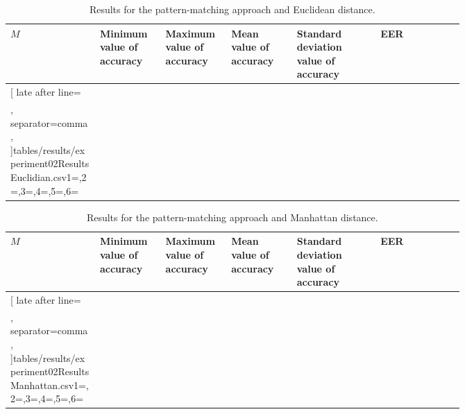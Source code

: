 \begin{table}[H]
	\newcommand{\mc}[3]{\multicolumn{#1}{#2}{#3}}
	\begin{center}
		\begin{tabular}{|p{0.15\linewidth}|p{0.11\linewidth}|p{0.11\linewidth}|p{0.11\linewidth}|p{0.14\linewidth}|p{0.14\linewidth}|}\hline
			\rowcolor{tcA}
			\centering\textbf{$M$} & \centering\textbf{Minimum value of accuracy} & \centering\textbf{Maximum value of accuracy} & \centering\textbf{Mean value of accuracy} & \centering\textbf{Standard deviation value of accuracy} & \textbf{\qquad EER}\\\hline

			\rowcolor{tcB}
			\csvreader[
			late after line=\\\hline\rowcolor{tcB},%
			separator=comma,
			]{tables/results/experiment02ResultsEuclidian.csv}{1=\eme,2=\minAccu,3=\maxAccu,4=\meanAccu,5=\stdDev,6=\eer}{\centering\eme\% & \centering\minAccu & \centering\maxAccu & \centering\meanAccu & \centering\stdDev & \qquad\eer}

		\end{tabular}
	\end{center}
	\caption{Results for the pattern-matching approach and Euclidean distance.}
	\label{tab:experiment02ResultsEuclidian}
\end{table}

\begin{table}[H]
	\newcommand{\mc}[3]{\multicolumn{#1}{#2}{#3}}
	\begin{center}
		\begin{tabular}{|p{0.15\linewidth}|p{0.11\linewidth}|p{0.11\linewidth}|p{0.11\linewidth}|p{0.14\linewidth}|p{0.14\linewidth}|}\hline
			\rowcolor{tcA}
			\centering\textbf{$M$} & \centering\textbf{Minimum value of accuracy} & \centering\textbf{Maximum value of accuracy} & \centering\textbf{Mean value of accuracy} & \centering\textbf{Standard deviation value of accuracy} & \textbf{\qquad EER}\\\hline
			
			\rowcolor{tcB}
			\csvreader[
			late after line=\\\hline\rowcolor{tcB},%
			separator=comma,
			]{tables/results/experiment02ResultsManhattan.csv}{1=\eme,2=\minAccu,3=\maxAccu,4=\meanAccu,5=\stdDev,6=\eer}{\centering\eme\% & \centering\minAccu & \centering\maxAccu & \centering\meanAccu & \centering\stdDev & \qquad\eer}
		\end{tabular}
	\end{center}
	\caption{Results for the pattern-matching approach and Manhattan distance.}
	\label{tab:experiment02ResultsManhattan}
\end{table}